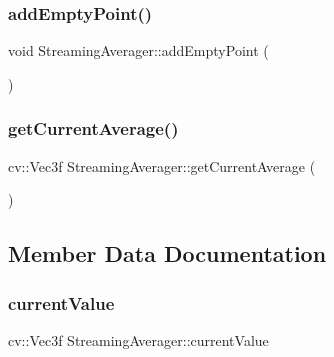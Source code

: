 \hypertarget{class_streaming_averager_a54346cb327b6d405181a7347efa086ed}{}\label{class_streaming_averager_a54346cb327b6d405181a7347efa086ed} 
\subsubsection{\texorpdfstring{add\+Empty\+Point()}{addEmptyPoint()}}
{\footnotesize\ttfamily void Streaming\+Averager\+::add\+Empty\+Point (\begin{DoxyParamCaption}{ }\end{DoxyParamCaption})}

\hypertarget{class_streaming_averager_a2388115084de5ec238c5a5b47bf20dc8}{}\label{class_streaming_averager_a2388115084de5ec238c5a5b47bf20dc8} 
\subsubsection{\texorpdfstring{get\+Current\+Average()}{getCurrentAverage()}}
{\footnotesize\ttfamily cv\+::\+Vec3f Streaming\+Averager\+::get\+Current\+Average (\begin{DoxyParamCaption}{ }\end{DoxyParamCaption})\hspace{0.3cm}{\ttfamily [private]}}



\subsection{Member Data Documentation}
\hypertarget{class_streaming_averager_a3a0923d6e95a69817321367b98aa9bf5}{}\label{class_streaming_averager_a3a0923d6e95a69817321367b98aa9bf5} 
\subsubsection{\texorpdfstring{current\+Value}{currentValue}}
{\footnotesize\ttfamily cv\+::\+Vec3f Streaming\+Averager\+::current\+Value\hspace{0.3cm}{\ttfamily [private]}}

